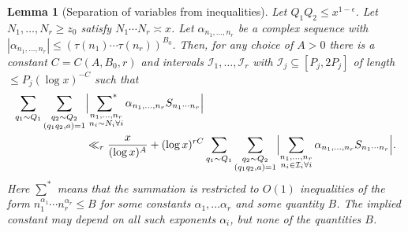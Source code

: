 \documentclass[10pt]{amsart}
\theoremstyle{plain}
\newtheorem{lmm}[thrm]{Lemma}
\numberwithin{equation}{section}
\begin{document}
%
%
%
%
%
%
%
%
\begin{lmm}[Separation of variables from inequalities]\label{lmm:Separation}
Let $Q_1Q_2\le x^{1-\epsilon}$. Let $N_1,\dots, N_r\ge z_0$ satisfy $N_1\cdots N_r\asymp x$. Let $\alpha_{n_1,\dots,n_r}$ be a complex sequence with $|\alpha_{n_1,\dots,n_r}|\le (\tau(n_1)\cdots \tau(n_r))^{B_0}$. Then, for any choice of $A>0$ there is a constant $C=C(A,B_0,r)$ and intervals $\mathcal{I}_1,\dots,\mathcal{I}_r$ with $\mathcal{I}_j\subseteq [P_j,2P_j]$ of length $\le P_j(\log{x})^{-C}$ such that
\begin{align*}
\sum_{q_1\sim Q_1}\sum_{\substack{q_2\sim Q_2\\ (q_1q_2,a)=1}}&\Bigl|\mathop{\sideset{}{^*}\sum}_{\substack{n_1,\dots,n_r\\ n_i\sim N_i\forall i}}\alpha_{n_1,\dots,n_r}S_{n_1\cdots n_r}\Bigr|\\
&\ll_r \frac{x}{(\log{x})^A}+(\log{x})^{r C}\sum_{q_1\sim Q_1}\sum_{\substack{q_2\sim Q_2\\ (q_1q_2,a)=1}}\Bigl|\sum_{\substack{n_1,\dots,n_r\\ n_i\in \mathcal{I}_i\forall i}}\alpha_{n_1,\dots,n_r}S_{n_1\cdots n_r}\Bigr|.
\end{align*}
Here $\sum^*$ means that the summation is restricted to $O(1)$ inequalities of the form $n_1^{\alpha_1}\cdots n_r^{\alpha_r}\le B$ for some constants $\alpha_1,\dots \alpha_r$ and some quantity $B$.  The implied constant may depend on all such exponents $\alpha_i$, but none of the quantities $B$.
\end{lmm}
%
%
%
%
\end{document}
